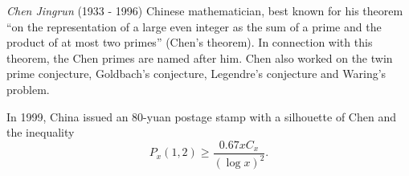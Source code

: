 \documentclass[12pt]{article}
\begin{document}
\emph{Chen Jingrun} (1933 - 1996) Chinese mathematician, best known for his theorem ``on the representation of a large even integer as the sum of a prime and the product of at most two primes'' (Chen's theorem). In connection with this theorem, the Chen primes are named after him. Chen also worked on the twin prime conjecture, Goldbach's conjecture, Legendre's conjecture and Waring's problem.

In 1999, China issued an 80-yuan postage stamp with a silhouette of Chen and the inequality $$P_x(1, 2) \ge \frac{0.67xC_x}{(\log x)^2}.$$
\end{document}
